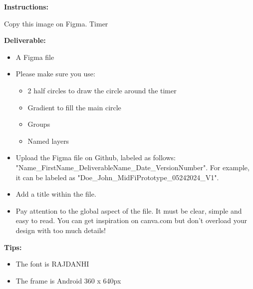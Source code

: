 \makeheaderfiles

\textbf{Instructions:}

Copy this image on Figma.
Timer

\textbf{Deliverable:}

\begin{itemize}
\item A Figma file
\item Please make sure you use:
\begin{itemize}
\item 2 half circles to draw the circle around the timer
\item Gradient to fill the main circle
\item Groups
\item Named layers
\end{itemize}
\item Upload the Figma file on Github, labeled as follows: "Name\_FirstName\_DeliverableName\_Date\_VersionNumber". For example, it can be labeled as "Doe\_John\_MidFiPrototype\_05242024\_V1".
\item Add a title within the file.
\item Pay attention to the global aspect of the file. It must be clear, simple and easy to read. You can get inspiration on canva.com but don't overload your design with too much details!
\end{itemize}

\textbf{Tips:}

\begin{itemize}
\item The font is RAJDANHI
\item The frame is Android 360 x 640px
\end{itemize}

